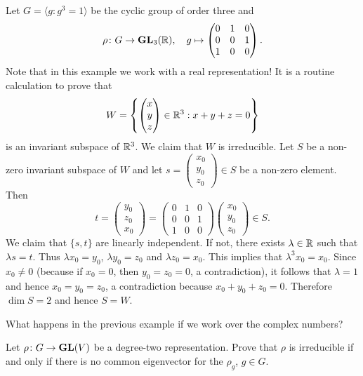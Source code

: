 \begin{example}
    Let $G=\langle g:g^3=1\rangle$ be the
    cyclic group of order three
    and
    \[
    \rho\colon G\to\mathbf{GL}_3(\mathbb{R}),
    \quad
    g\mapsto\begin{pmatrix}
        0&1&0\\
        0&0&1\\
        1&0&0
    \end{pmatrix}.
    \]
    Note that in this example we work with a real representation! 
    It is a routine calculation to prove that 
    \[
    W=\left\{
    \begin{pmatrix}
    x\\
    y\\
    z
    \end{pmatrix}\in\mathbb{R}^3:x+y+z=0\right\}
    \]
    is an invariant subspace of $\mathbb{R}^3$. We claim that $W$ 
    is irreducible. Let $S$ be a non-zero invariant subspace of 
    $W$ and let $s=\begin{pmatrix}x_0\\y_0\\z_0\end{pmatrix}\in S$ be a non-zero element. Then
    \[
    t=\begin{pmatrix}y_0\\z_0\\x_0\end{pmatrix}
    =\begin{pmatrix}
        0&1&0\\
        0&0&1\\
        1&0&0
    \end{pmatrix}
    \begin{pmatrix}x_0\\y_0\\z_0\end{pmatrix}\in S.
    \]
    We claim that $\{s,t\}$ are linearly independent. If not, there exists $\lambda\in\mathbb{R}$ such that
    $\lambda s=t$. Thus $\lambda x_0=y_0$, $\lambda y_0=z_0$ and $\lambda z_0=x_0$. This implies that
    $\lambda^3x_0=x_0$. Since $x_0\ne 0$ (because if $x_0=0$, then $y_0=z_0=0$, a contradiction), it follows that
    $\lambda=1$ and hence $x_0=y_0=z_0$, a contradiction because $x_0+y_0+z_0=0$.
    Therefore $\dim S=2$ and hence $S=W$.
\end{example}

What happens in the previous example if we work over the complex numbers?

\begin{exercise}
    Let $\rho\colon G\to\mathbf{GL}(V)$ be a degree-two representation. Prove that
    $\rho$ is irreducible if and only if there is no common eigenvector for the $\rho_g$, $g\in G$.
\end{exercise}


